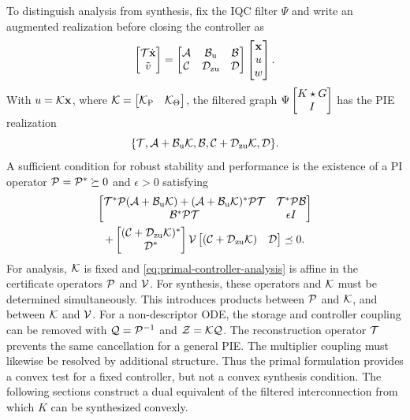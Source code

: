 To distinguish analysis from synthesis, fix the IQC filter $\Psi$ and write an
augmented realization before closing the controller as
\begin{equation}\label{eq:primal-filtered-open-loop}
\begin{bmatrix}\mathcal{T}\dot{\mathbf{x}}\\\tilde v\end{bmatrix}
=
\begin{bmatrix}\mathcal{A}&\mathcal{B}_{{\mathrm{u}}}&\mathcal{B}\\
       \mathcal{C}&\mathcal{D}_{{\mathrm{zu}}}&\mathcal{D}\end{bmatrix}
\begin{bmatrix}\mathbf{x}\\u\\w\end{bmatrix}.
\end{equation}
With $u=\mathcal{K}\mathbf{x}$, where
$\mathcal{K}=\begin{bmatrix}\mathcal{K}_{{\mathrm{P}}}&\mathcal{K}_\Theta\end{bmatrix}$, the filtered graph
$\Psi\begin{bmatrix}K\star G\\I\end{bmatrix}$ has the PIE realization
\[
\{\mathcal{T},\mathcal{A}+\mathcal{B}_{{\mathrm{u}}}\mathcal{K},\mathcal{B},
\mathcal{C}+\mathcal{D}_{{\mathrm{zu}}}\mathcal{K},\mathcal{D}\}.
\]
A sufficient condition for robust stability and performance is the existence
of a PI operator $\mathcal{P}=\mathcal{P}^*\succeq0$ and $\epsilon>0$ satisfying
\begin{equation}\label{eq:primal-controller-analysis}
\begin{gathered}
\begin{bmatrix}\mathcal{T}^*\mathcal{P}(\mathcal{A}+\mathcal{B}_{{\mathrm{u}}}\mathcal{K})
+(\mathcal{A}+\mathcal{B}_{{\mathrm{u}}}\mathcal{K})^*\mathcal{P}\mathcal{T}
&\mathcal{T}^*\mathcal{P}\mathcal{B}\\
\mathcal{B}^*\mathcal{P}\mathcal{T}&\epsilon I\end{bmatrix}\\
+\begin{bmatrix}(\mathcal{C}+\mathcal{D}_{{\mathrm{zu}}}\mathcal{K})^*\\\mathcal{D}^*\end{bmatrix}
\mathcal{V}
\begin{bmatrix}(\mathcal{C}+\mathcal{D}_{{\mathrm{zu}}}\mathcal{K})&\mathcal{D}\end{bmatrix}
\preceq0.
\end{gathered}
\end{equation}
For analysis, $\mathcal{K}$ is fixed and
\eqref{eq:primal-controller-analysis} is affine in the certificate operators
$\mathcal{P}$ and $\mathcal{V}$. For synthesis, these operators and $\mathcal{K}$ must be
determined simultaneously. This introduces products between $\mathcal{P}$ and
$\mathcal{K}$, and between $\mathcal{K}$ and $\mathcal{V}$.
For a non-descriptor ODE, the storage and controller coupling can be removed
with $\mathcal{Q}=\mathcal{P}^{-1}$ and $\mathcal{Z}=\mathcal{K}\mathcal{Q}$. The reconstruction
operator $\mathcal{T}$ prevents the same cancellation for a general PIE. The
multiplier coupling must likewise be resolved by additional structure. Thus
the primal formulation provides a convex test for a fixed controller, but not
a convex synthesis condition. The following sections construct a dual
equivalent of the filtered interconnection from which $K$ can be synthesized
convexly.
